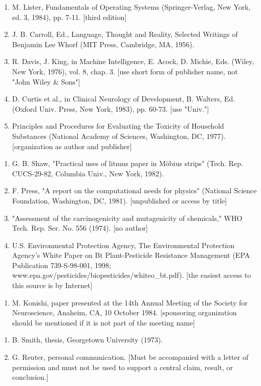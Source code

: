 \begin{enumerate}
\item M. Lister, Fundamentals of Operating Systems (Springer-Verlag, New York, ed. 3, 1984), pp. 7-11. [third edition]
\item J. B. Carroll, Ed., Language, Thought and Reality, Selected Writings of Benjamin Lee Whorf (MIT Press, Cambridge, MA, 1956).
\item R. Davis, J. King, in Machine Intelligence, E. Acock, D. Michie, Eds. (Wiley, New York, 1976), vol. 8, chap. 3. [use short form of publisher name, not "John Wiley \& Sons"]
\item D. Curtis et al., in Clinical Neurology of Development, B. Walters, Ed. (Oxford Univ. Press, New York, 1983), pp. 60-73. [use "Univ."]
\item Principles and Procedures for Evaluating the Toxicity of Household Substances (National Academy of Sciences, Washington, DC, 1977). [organization as author and publisher]
\end{enumerate}
\begin{enumerate}
\item G. B. Shaw, "Practical uses of litmus paper in Möbius strips" (Tech. Rep. CUCS-29-82, Columbia Univ., New York, 1982).
\item F. Press, "A report on the computational needs for physics" (National Science Foundation, Washington, DC, 1981). [unpublished or access by title]
\item "Assessment of the carcinogenicity and mutagenicity of chemicals," WHO Tech. Rep. Ser. No. 556 (1974). [no author]
\item U.S. Environmental Protection Agency, The Environmental Protection Agency's White Paper on Bt Plant-Pesticide Resistance Management (EPA Publication 739-S-98-001, 1998; www.epa.gov/pesticides/biopesticides/whiteo\_bt.pdf). [the easiest access to this source is by Internet]
\end{enumerate}
\begin{enumerate}
\item M. Konishi, paper presented at the 14th Annual Meeting of the Society for Neuroscience, Anaheim, CA, 10 October 1984. [sponsoring organization should be mentioned if it is not part of the meeting name]
\end{enumerate}
\begin{enumerate}
\item B. Smith, thesis, Georgetown University (1973).
\item G. Reuter, personal communication. [Must be accompanied with a letter of permission and must not be used to support a central claim, result, or conclusion.]
\end{enumerate}

